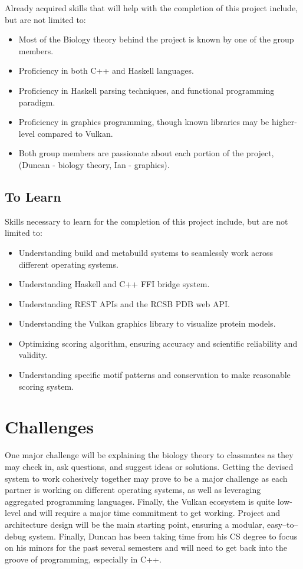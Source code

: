 \documentclass[12pt]{article}
\begin{document}
		Already acquired skills that will help with the completion of this project
		include, but are not limited to:

		\begin{itemize}[noitemsep]
			\item Most of the Biology theory behind the project is known by
				one of the group members.
			\item Proficiency in both C++ and Haskell languages.
			\item Proficiency in Haskell parsing techniques, and functional
				programming paradigm.
			\item Proficiency in graphics programming, though known libraries
				may be higher-level compared to Vulkan.
			\item Both group members are passionate about each portion of the
				project, (Duncan - biology theory, Ian - graphics).
		\end{itemize}

		\subsection*{To Learn}

		Skills necessary to learn for the completion of this project include,
		but are not limited to:
		
		\begin{itemize}[noitemsep]
			\item Understanding build and metabuild systems to seamlessly work
				across different operating systems.
			\item Understanding Haskell and C++ FFI bridge system.
			\item Understanding REST APIs and the RCSB PDB web API.
			\item Understanding the Vulkan graphics library to visualize protein
				models.
			\item Optimizing scoring algorithm, ensuring accuracy and scientific
				reliability and validity.
			\item Understanding specific motif patterns and conservation to make
				reasonable scoring system.
		\end{itemize}

	\section*{Challenges}

	One major challenge will be explaining the biology theory to classmates
	as they may check in, ask questions, and suggest ideas or solutions.
	Getting the devised system to work cohesively together may prove to be
	a major challenge as each partner is working on different operating systems,
	as well as leveraging aggregated programming languages. Finally, the Vulkan
	ecosystem is quite low-level and will require a major time commitment to
	get working. Project and architecture design will be the main starting point,
	ensuring a modular, easy--to--debug system. Finally, Duncan has been taking
	time from his CS degree to focus on his minors for the past several semesters
	and will need to get back into the groove of programming, especially in C++.
\end{document}
